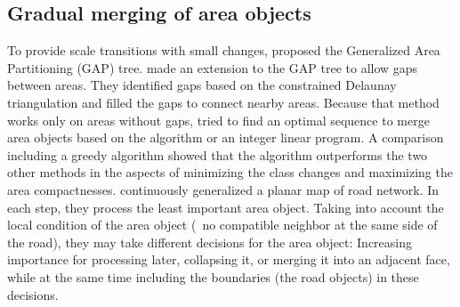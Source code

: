 \documentclass[twocolumn]{svjour3}          %
\begin{document}
\subsection{Gradual merging of area objects}
\label{sec:gradual_merge}

To provide scale transitions with small changes, 
\citet{vanOosterom1995GAPTree} proposed 
the Generalized Area Partitioning (GAP) tree.
\citet{Ai2002GAP} made an extension to the GAP tree
to allow gaps between areas.
They identified gaps based on the constrained Delaunay triangulation
and filled the gaps to connect nearby areas.
Because that method works only on areas without gaps,
\citet{Peng2020AreaAgg} tried to 
find an optimal sequence to merge area objects 
based on the \Astar algorithm or an integer linear program.
A comparison including a greedy algorithm showed that 
the \Astar algorithm outperforms the two other methods 
in the aspects of minimizing the class changes 
and maximizing the area compactnesses.
\citet{Suba2016Road} continuously generalized a planar map of road network.
In each step, they process the least important area object.
Taking into account the local condition of the area object
(\eg~no compatible neighbor at the same side of the road),
they may take different decisions for the area object: 
Increasing importance for processing later, collapsing it, 
or merging it into an adjacent face, 
while at the same time including the boundaries (the road objects) in these decisions.
\end{document}
